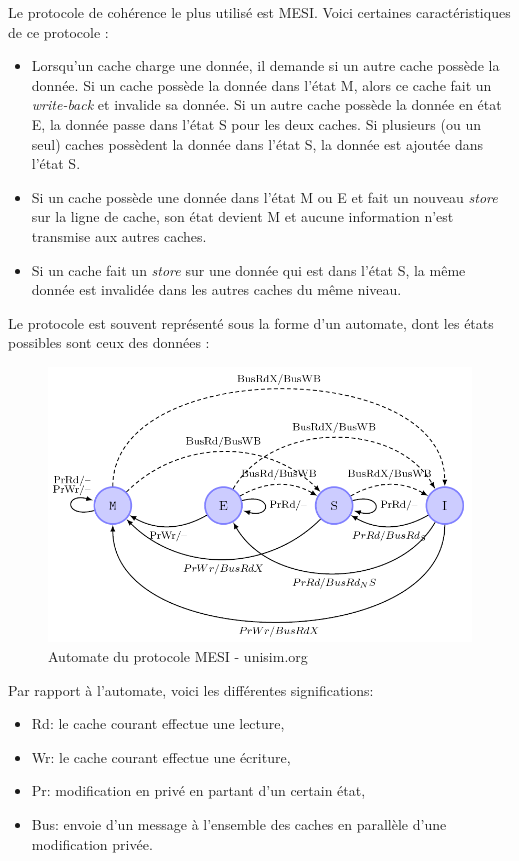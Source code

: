 Le protocole de cohérence le plus utilisé est MESI. Voici certaines caractéristiques de ce protocole : \\
\begin{itemize}
\item Lorsqu'un cache charge une donnée, il demande si un autre cache possède la donnée. Si un cache possède la donnée dans l'état M, alors ce cache fait un \emph{write-back} et invalide sa donnée. Si un autre cache possède la donnée en état E, la donnée passe dans l'état S pour les deux caches. Si plusieurs (ou un seul) caches possèdent la donnée dans l'état S, la donnée est ajoutée dans l'état S.
\item Si un cache possède une donnée dans l'état M ou E et fait un nouveau \textit{store} sur la ligne de cache, son état devient M et aucune information n'est transmise aux autres caches.
\item Si un cache fait un \textit{store} sur une donnée qui est dans l'état S, la même donnée est invalidée dans les autres caches du même niveau. \\
\end{itemize}

Le protocole est souvent représenté sous la forme d'un automate, dont les états possibles sont ceux des données : \\

\begin{figure}[H]
\begin{center}
   \includegraphics[scale=0.45]{images/mesi.png}
   \caption{\label{img:mesi} Automate du protocole MESI - unisim.org}
\end{center}
\end{figure}
Par rapport à l'automate, voici les différentes significations: \\
\begin{itemize}
\item Rd: le cache courant effectue une lecture,
\item Wr: le cache courant effectue une écriture,
\item Pr: modification en privé en partant d'un certain état,
\item Bus: envoie d'un message à l'ensemble des caches en parallèle d'une modification privée. \\
\end{itemize}

